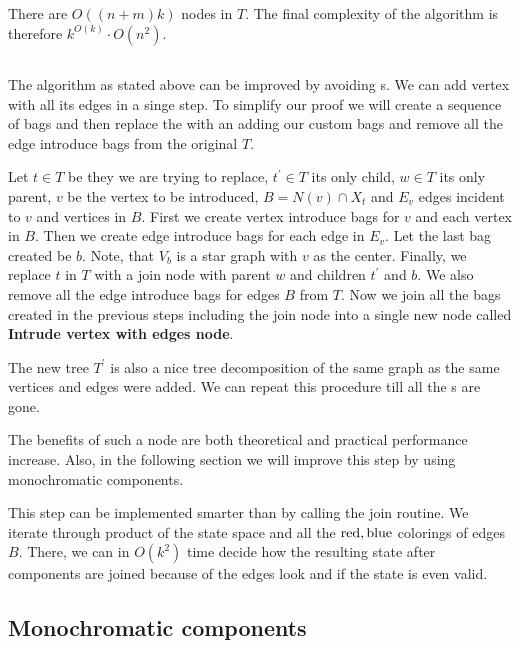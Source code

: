 There are \( O((n+m)k) \) nodes in \( T \).
The final complexity of the algorithm is therefore
\( {k}^{O(k)} \cdot O(n^2) \).

\subsection{\IntroduceVertexWithEdgesNode}

The algorithm as stated above can be improved by avoiding \IntroduceEdgeNode{}s.
We can add vertex with all its edges in a singe step.
To simplify our proof we will create a sequence of bags and then replace the
\IntroduceVertexNode{} with an \JoinNode{} adding our custom bags
and remove all the edge introduce bags from the original \( T \).

Let \( t \in T \) be they \IntroduceVertexNode{} we are trying to replace,
\( t^\prime \in T \) its only child,
\( w \in T \) its only parent,
\( v \) be the vertex to be introduced,
\( B = N(v) \cap X_t \) and
\( E_v \) edges incident to \( v \) and vertices in \( B \).
First we create vertex introduce bags for \( v \) and each vertex in \( B \).
Then we create edge introduce bags for each edge in \( E_v \).
Let the last bag created be \( b \).
Note, that \( V_b \) is a star graph with \( v \) as the center.
Finally, we replace \( t \) in \( T \) with a join node
with parent \( w \) and children \( t^\prime \) and \( b \).
We also remove all the edge introduce bags for edges \( B \) from \( T \).
Now we join all the bags created in the previous steps including the join node
into a single new node called \textbf{Intrude vertex with edges node}.

The new tree \( T^\prime \) is also a nice tree decomposition
of the same graph as the same vertices and edges were added.
We can repeat this procedure till all the \IntroduceEdgeNode{}s are gone.

The benefits of such a node are both theoretical and practical performance increase.
Also, in the following section we will improve this step by using monochromatic components.

This step can be implemented smarter than by calling the join routine.
We iterate through product of the state space and all the \( \text{red}, \text{blue} \)
colorings of edges \( B \). There, we can in \( O(k^2) \) time decide
how the resulting state after components are joined because of the edges look and
if the state is even valid.

\subsection{Monochromatic components}

